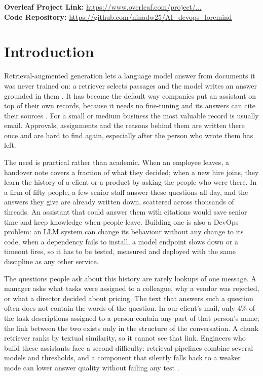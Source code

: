 \documentclass[12pt,onecolumn,draftclsnofoot]{IEEEtran}
\begin{document}
\noindent\textbf{Overleaf Project Link:} \url{https://www.overleaf.com/project/...}\\
\textbf{Code Repository:} \url{https://github.com/ninadw25/AI_devops_loremind}

\section{Introduction}

Retrieval-augmented generation lets a language model answer from documents it was never trained on: a retriever selects passages and the model writes an answer grounded in them \cite{lewis2020rag}. It has become the default way companies put an assistant on top of their own records, because it needs no fine-tuning and its answers can cite their sources \cite{gao2023ragsurvey}. For a small or medium business the most valuable record is usually email. Approvals, assignments and the reasons behind them are written there once and are hard to find again, especially after the person who wrote them has left.

The need is practical rather than academic. When an employee leaves, a handover note covers a fraction of what they decided; when a new hire joins, they learn the history of a client or a product by asking the people who were there. In a firm of fifty people, a few senior staff answer these questions all day, and the answers they give are already written down, scattered across thousands of threads. An assistant that could answer them with citations would save senior time and keep knowledge when people leave. Building one is also a DevOps problem: an LLM system can change its behaviour without any change to its code, when a dependency fails to install, a model endpoint slows down or a timeout fires, so it has to be tested, measured and deployed with the same discipline as any other service.

The questions people ask about this history are rarely lookups of one message. A manager asks what tasks were assigned to a colleague, why a vendor was rejected, or what a director decided about pricing. The text that answers such a question often does not contain the words of the question. In our client's mail, only 4\% of the task descriptions assigned to a person contain any part of that person's name; the link between the two exists only in the structure of the conversation. A chunk retriever ranks by textual similarity, so it cannot see that link. Engineers who build these assistants face a second difficulty: retrieval pipelines combine several models and thresholds, and a component that silently falls back to a weaker mode can lower answer quality without failing any test \cite{barnett2024failure}.
\end{document}
